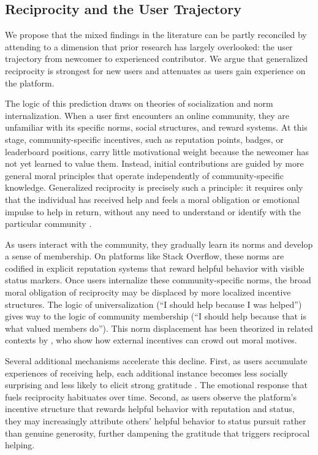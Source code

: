 \subsection{Reciprocity and the User Trajectory}

We propose that the mixed findings in the literature can be partly reconciled by attending to a dimension that prior research has largely overlooked: the user trajectory from newcomer to experienced contributor. We argue that generalized reciprocity is strongest for new users and attenuates as users gain experience on the platform.

The logic of this prediction draws on theories of socialization and norm internalization. When a user first encounters an online community, they are unfamiliar with its specific norms, social structures, and reward systems. At this stage, community-specific incentives, such as reputation points, badges, or leaderboard positions, carry little motivational weight because the newcomer has not yet learned to value them. Instead, initial contributions are guided by more general moral principles that operate independently of community-specific knowledge. Generalized reciprocity is precisely such a principle: it requires only that the individual has received help and feels a moral obligation or emotional impulse to help in return, without any need to understand or identify with the particular community \citep{levine_logic_2020, curry_is_2019}.

As users interact with the community, they gradually learn its norms and develop a sense of membership. On platforms like Stack Overflow, these norms are codified in explicit reputation systems that reward helpful behavior with visible status markers. Once users internalize these community-specific norms, the broad moral obligation of reciprocity may be displaced by more localized incentive structures. The logic of universalization (``I should help because I was helped'') gives way to the logic of community membership (``I should help because that is what valued members do''). This norm displacement has been theorized in related contexts by \citet{benabou_incentives_2006}, who show how external incentives can crowd out moral motives.

Several additional mechanisms accelerate this decline. First, as users accumulate experiences of receiving help, each additional instance becomes less socially surprising and less likely to elicit strong gratitude \citep{mccullough_adaptation_2008}. The emotional response that fuels reciprocity habituates over time. Second, as users observe the platform's incentive structure that rewards helpful behavior with reputation and status, they may increasingly attribute others' helpful behavior to status pursuit rather than genuine generosity, further dampening the gratitude that triggers reciprocal helping.

